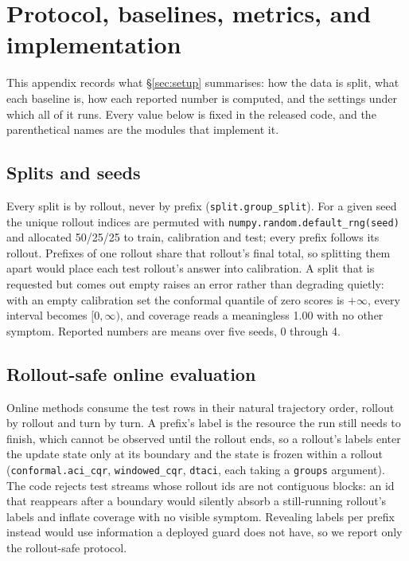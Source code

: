 \documentclass{article}
\begin{document}
\section{Protocol, baselines, metrics, and implementation}
\label{app:protocol}

This appendix records what \S\ref{sec:setup} summarises: how the data is split, what
each baseline is, how each reported number is computed, and the settings under which
all of it runs. Every value below is fixed in the released code, and the parenthetical
names are the modules that implement it.

\subsection{Splits and seeds}
\label{app:splits}

Every split is by rollout, never by prefix (\texttt{split.group\_split}). For a given
seed the unique rollout indices are permuted with
\texttt{numpy.random.default\_rng(seed)} and allocated 50/25/25 to train, calibration
and test; every prefix follows its rollout. Prefixes of one rollout share that
rollout's final total, so splitting them apart would place each test rollout's answer
into calibration. A split that is requested but comes out empty raises an error rather
than degrading quietly: with an empty calibration set the conformal quantile of zero
scores is $+\infty$, every interval becomes $[0, \infty)$, and coverage reads a
meaningless 1.00 with no other symptom. Reported numbers are means over five seeds,
0 through 4.

\subsection{Rollout-safe online evaluation}
\label{app:online}

Online methods consume the test rows in their natural trajectory order, rollout by
rollout and turn by turn. A prefix's label is the resource the run still needs to
finish, which cannot be observed until the rollout ends, so a rollout's labels enter
the update state only at its boundary and the state is frozen within a rollout
(\texttt{conformal.aci\_cqr}, \texttt{windowed\_cqr}, \texttt{dtaci}, each taking a
\texttt{groups} argument). The code rejects test streams whose rollout ids are not
contiguous blocks: an id that reappears after a boundary would silently absorb a
still-running rollout's labels and inflate coverage with no visible symptom. Revealing
labels per prefix instead would use information a deployed guard does not have, so we
report only the rollout-safe protocol.
\end{document}
